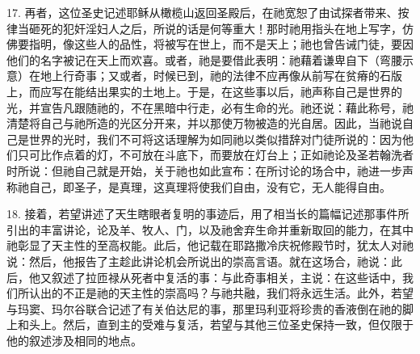 17. 再者，这位圣史记述耶稣从橄榄山返回圣殿后，在祂宽恕了由试探者带来、按律当砸死的犯奸淫妇人之后，所说的话是何等重大！那时祂用指头在地上写字，仿佛要指明，像这些人的品性，将被写在世上，而不是天上；祂也曾告诫门徒，要因他们的名字被记在天上而欢喜。或者，祂是要借此表明：祂藉着谦卑自下（弯腰示意）在地上行奇事；又或者，时候已到，祂的法律不应再像从前写在贫瘠的石版上，而应写在能结出果实的土地上。于是，在这些事以后，祂声称自己是世界的光，并宣告凡跟随祂的，不在黑暗中行走，必有生命的光。祂还说：藉此称号，祂清楚将自己与祂所造的光区分开来，并以那使万物被造的光自居。因此，当祂说自己是世界的光时，我们不可将这话理解为如同祂以类似措辞对门徒所说的：因为他们只可比作点着的灯，不可放在斗底下，而要放在灯台上；正如祂论及圣若翰洗者时所说：但祂自己就是开始，关于祂也如此宣布：在所讨论的场合中，祂进一步声称祂自己，即圣子，是真理，这真理将使我们自由，没有它，无人能得自由。\par

18. 接着，若望讲述了天生瞎眼者复明的事迹后，用了相当长的篇幅记述那事件所引出的丰富讲论，论及羊、牧人、门，以及祂舍弃生命并重新取回的能力，在其中祂彰显了天主性的至高权能。此后，他记载在耶路撒冷庆祝修殿节时，犹太人对祂说：然后，他报告了主趁此讲论机会所说出的崇高言语。就在这场合，祂说：此后，他又叙述了拉匝禄从死者中复活的事：与此奇事相关，主说：在这些话中，我们所认出的不正是祂的天主性的崇高吗？与祂共融，我们将永远生活。此外，若望与玛窦、玛尔谷联合记述了有关伯达尼的事，那里玛利亚将珍贵的香液倒在祂的脚上和头上。然后，直到主的受难与复活，若望与其他三位圣史保持一致，但仅限于他的叙述涉及相同的地点。\par

